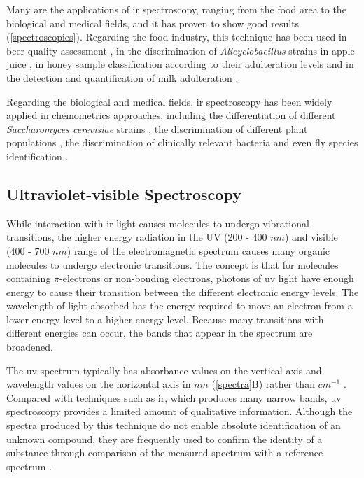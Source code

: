 Many are the applications of \gls{ir} spectroscopy, ranging from the food area to the biological and medical fields, and it has proven to show good results (\autoref{spectroscopies}). Regarding the food industry, this technique has been used in beer quality assessment \citep{polshin2011beer}, in the discrimination of \textit{Alicyclobacillus} strains in apple juice \citep{lin2005rapid}, in honey sample classification according to their adulteration levels \citep{norazian2012hybrid} and in the detection and quantification of milk adulteration \citep{santos2013rapid}.


Regarding the biological and medical fields, \gls{ir} spectroscopy has been widely applied in  chemometrics approaches, including the differentiation of different \textit{Saccharomyces cerevisiae} strains \citep{cozzolino2006combining}, the discrimination of different plant populations \citep{khairudin2014direct, uarrota2014metabolomics}, the discrimination of clinically relevant bacteria \citep{preisner2007fourier} and even fly species identification \citep{de2011barcoding}.


\subsection{Ultraviolet-visible Spectroscopy}

While interaction with \gls{ir} light causes molecules to undergo vibrational transitions, the higher energy radiation in the UV (200 - 400 $ nm $) and visible (400 - 700 $ nm $) range of the electromagnetic spectrum causes many organic molecules to undergo electronic transitions. The concept is that for molecules containing $ \pi $-electrons or non-bonding electrons, photons of \acrfull{uv} light have enough energy to cause their transition between the different electronic energy levels. The wavelength of light absorbed has the energy required to move an electron from a lower energy level to a higher energy level. Because many transitions with different energies can occur, the bands that appear in the spectrum are broadened.

The \gls{uv} spectrum typically has absorbance values on the vertical axis and  wavelength values on the horizontal axis in $ nm $ (\autoref{spectra}B) rather than $ cm^{-1} $ \citep{soderberg2010organic}. Compared with techniques such as \gls{ir}, which produces many narrow bands, \gls{uv} spectroscopy provides a limited amount of qualitative information. Although the spectra produced by this technique do not enable absolute identification of an unknown compound, they are frequently used to confirm the identity of a substance through comparison of the measured spectrum with a reference spectrum \citep{owen1996fundamentals}.

